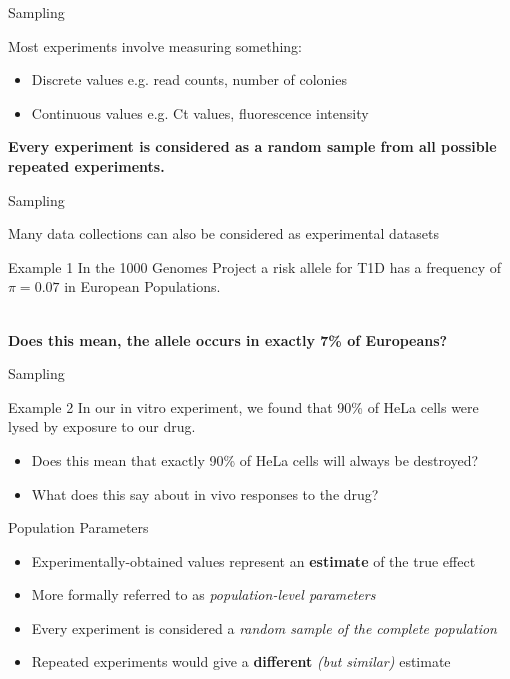 \documentclass[aspectratio=169,11pt]{beamer}
\begin{document}
\begin{frame}{Sampling}

Most experiments involve measuring something:

	\begin{itemize}
		\item Discrete values e.g. read counts, number of colonies
		\item Continuous values e.g. Ct values, fluorescence intensity
	\end{itemize}

	\textbf{Every experiment is considered as a random sample from all possible repeated experiments.}

\end{frame}

\begin{frame}{Sampling}

	Many data collections can also be considered as experimental datasets
	
	\begin{block}{Example 1}
	In the 1000 Genomes Project a risk allele for T1D has a frequency of $\pi = 0.07$ in European Populations.
	\end{block}
	
	~\\
	\textbf{Does this mean, the allele occurs in exactly 7\% of Europeans?}

\end{frame}

\begin{frame}{Sampling}

	\begin{block}{Example 2}
	In our in vitro experiment, we found that 90\% of HeLa cells were lysed by exposure to our drug.
	\end{block}
	
		\begin{itemize}
			\item Does this mean that exactly 90\% of HeLa cells will always be destroyed?
			\item What does this say about in vivo responses to the drug?
		\end{itemize}

\end{frame}

\begin{frame}{Population Parameters}

	\begin{itemize}
		\item Experimentally-obtained values represent an \textbf{estimate} of the true effect
		\item More formally referred to as \textit{population-level parameters}
		\item Every experiment is considered a \textit{random sample of the complete population}
		\item Repeated experiments would give a \textbf{different} \textit{(but similar)} estimate
	\end{itemize}

\end{frame}
\end{document}
